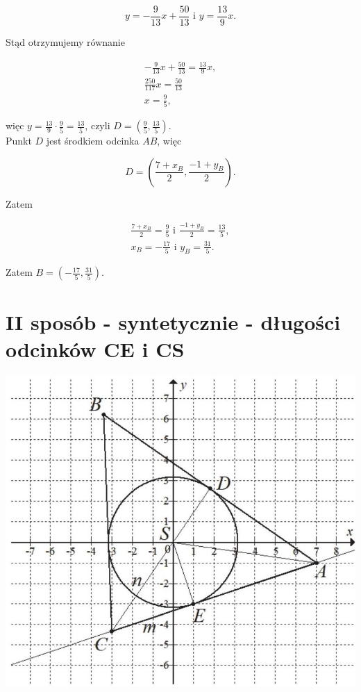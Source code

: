 \documentclass[10pt]{article}
\begin{document}
$$
y=-\frac{9}{13} x+\frac{50}{13} \text { i } y=\frac{13}{9} x .
$$

Stąd otrzymujemy równanie

$$
\begin{gathered}
-\frac{9}{13} x+\frac{50}{13}=\frac{13}{9} x, \\
\frac{250}{117} x=\frac{50}{13} \\
x=\frac{9}{5},
\end{gathered}
$$

więc $y=\frac{13}{9} \cdot \frac{9}{5}=\frac{13}{5}$, czyli $D=\left(\frac{9}{5}, \frac{13}{5}\right)$.\\
Punkt $D$ jest środkiem odcinka $A B$, więc

$$
D=\left(\frac{7+x_{B}}{2}, \frac{-1+y_{B}}{2}\right) .
$$

Zatem

$$
\begin{gathered}
\frac{7+x_{B}}{2}=\frac{9}{5} \text { i } \frac{-1+y_{B}}{2}=\frac{13}{5}, \\
x_{B}=-\frac{17}{5} \text { i } y_{B}=\frac{31}{5} .
\end{gathered}
$$

Zatem $B=\left(-\frac{17}{5}, \frac{31}{5}\right)$.

\section*{II sposób - syntetycznie - długości odcinków CE i CS}
\begin{center}
\includegraphics[max width=\textwidth]{2025_02_07_a13180f11f288af0ed0dg-26}
\end{center}
\end{document}
